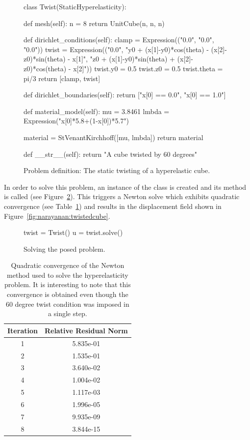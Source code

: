 \begin{figure}
\begin{python}
class Twist(StaticHyperelasticity):

    def mesh(self):
        n = 8
        return UnitCube(n, n, n)

    def dirichlet_conditions(self):
        clamp = Expression(("0.0", "0.0", "0.0"))
        twist = Expression(("0.0",
        "y0 + (x[1]-y0)*cos(theta) - (x[2]-z0)*sin(theta) - x[1]",
        "z0 + (x[1]-y0)*sin(theta) + (x[2]-z0)*cos(theta) - x[2]"))
        twist.y0 = 0.5
        twist.z0 = 0.5
        twist.theta = pi/3
        return [clamp, twist]

    def dirichlet_boundaries(self):
        return ["x[0] == 0.0", "x[0] == 1.0"]

    def material_model(self):
        mu    = 3.8461
        lmbda = Expression("x[0]*5.8+(1-x[0])*5.7")

        material = StVenantKirchhoff([mu, lmbda])
        return material

    def __str__(self):
        return "A cube twisted by 60 degrees"
\end{python}
\caption{Problem definition: The static twisting of a hyperelastic
  cube.}
\label{code:narayanan:statictwist}
\end{figure}

In order to solve this problem, an instance of the  class
is created and its  method is called (see
Figure~\ref{code:narayanan:solveproblem}). This triggers a Newton
solve which exhibits quadratic convergence (see
Table~\ref{tab:narayanan:residualnorms}) and results in the
displacement field shown in
Figure~\ref{fig:narayanan:twistedcube}.

\begin{figure}
\begin{python}
twist = Twist()
u = twist.solve()
\end{python}
\caption{Solving the posed problem.}
\label{code:narayanan:solveproblem}
\end{figure}

\begin{table}
  \centering
    \begin{tabular}{cc}
      \toprule
      Iteration & Relative Residual Norm \\
      \midrule
      1 & 5.835e-01\\
      2 & 1.535e-01\\
      3 & 3.640e-02\\
      4 & 1.004e-02\\
      5 & 1.117e-03\\
      6 & 1.996e-05\\
      7 & 9.935e-09\\
      8 & 3.844e-15\\
      \bottomrule
    \end{tabular}
    \caption{Quadratic convergence of the Newton method used to solve
      the hyperelasticity problem. It is interesting to note that this
      convergence is obtained even though the 60 degree twist
      condition was imposed in a single step.}
    \label{tab:narayanan:residualnorms}
\end{table}

